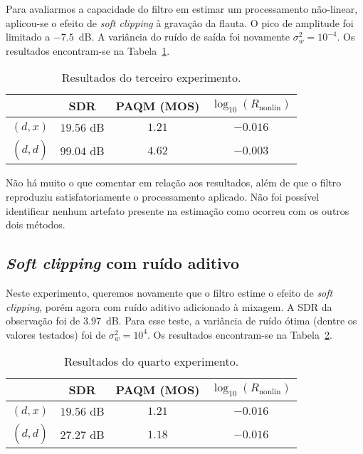 Para avaliarmos a capacidade do filtro em estimar um processamento não-linear,
aplicou-se o efeito de \textit{soft clipping} à gravação da flauta. O pico de amplitude
foi limitado a $-7.5$~dB. A variância do ruído de saída foi novamente $\sigma_w^2 =
	10^{-4}$. Os resultados encontram-se na Tabela~\ref{tab:unscented:experiment-3}.
{\def\arraystretch{1.25}\tabcolsep=10pt
\begin{table}[!ht]
	\centering
	\caption[Resultados do terceiro experimento: \textit{soft clipping}]{Resultados do terceiro experimento.}
	\label{tab:unscented:experiment-3}
	\begin{tabular}{cccc}
		\toprule
		               & SDR        & PAQM (MOS) & $\log_{10}(R_{\text{nonlin}})$ \\
		\midrule
		$(d, x)$       & $19.56$ dB & $1.21$     & $-0.016$                       \\
		$(d, \hat{d})$ & $99.04$ dB & $4.62$     & $-0.003$                       \\ \bottomrule
	\end{tabular}
\end{table}
}

Não há muito o que comentar em relação aos resultados, além de que o filtro reproduziu
satisfatoriamente o processamento aplicado. Não foi possível identificar nenhum
artefato presente na estimação como ocorreu com os outros dois métodos.

\subsection{\textit{Soft clipping} com ruído aditivo}

Neste experimento, queremos novamente que o filtro estime o efeito de \textit{soft
	clipping}, porém agora com ruído aditivo adicionado à mixagem. A SDR da observação foi
de $3.97$~dB. Para esse teste, a variância de ruído ótima (dentre os valores testados)
foi de $\sigma_w^2 = 10^{4}$. Os resultados encontram-se na
Tabela~\ref{tab:unscented:experiment-4}. {\def\arraystretch{1.25}\tabcolsep=10pt
\begin{table}[!ht]
	\centering
	\caption[Resultados do quarto experimento: \textit{soft clipping} com ruído aditivo]{Resultados do quarto experimento.}
	\label{tab:unscented:experiment-4}
	\begin{tabular}{cccc}
		\toprule
		               & SDR        & PAQM (MOS) & $\log_{10}(R_{\text{nonlin}})$ \\
		\midrule
		$(d, x)$       & $19.56$ dB & $1.21$     & $-0.016$                       \\
		$(d, \hat{d})$ & $27.27$ dB & $1.18$     & $-0.016$                       \\ \bottomrule
	\end{tabular}
\end{table}
}

